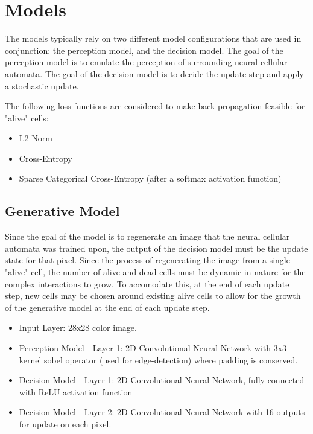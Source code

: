 \documentclass[conference]{IEEEtran}
\begin{document}
\section{Models}

The models typically rely on two different model configurations that are used in conjunction: the perception model, and the decision model. The goal of the perception model is to emulate the perception of surrounding neural cellular automata. The goal of the decision model is to decide the update step and apply a stochastic update.

The following loss functions are considered to make back-propagation feasible for "alive" cells:

\begin{itemize}
    \item L2 Norm
    \item Cross-Entropy
    \item Sparse Categorical Cross-Entropy (after a softmax activation function)
\end{itemize}

\subsection{Generative Model}

Since the goal of the model is to regenerate an image that the neural cellular automata was trained upon, the output of the decision model must be the update state for that pixel. Since the process of regenerating the image from a single "alive" cell, the number of alive and dead cells must be dynamic in nature for the complex interactions to grow. To accomodate this, at the end of each update step, new cells may be chosen around existing alive cells to allow for the growth of the generative model at the end of each update step.

\begin{itemize}
    \item Input Layer: 28x28 color image.
    \item Perception Model - Layer 1: 2D Convolutional Neural Network with 3x3 kernel sobel operator (used for edge-detection) where padding is conserved.
    \item Decision Model - Layer 1: 2D Convolutional Neural Network, fully connected with ReLU activation function
    \item Decision Model - Layer 2: 2D Convolutional Neural Network with 16 outputs for update on each pixel.
\end{itemize}
\end{document}
